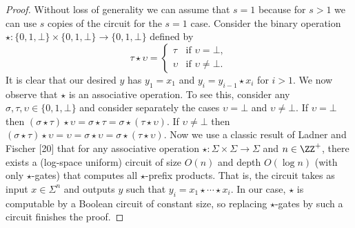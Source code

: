 \begin{proof}
Without loss of generality we can assume that $s=1$ because for $s>1$ we can use $s$ copies of the circuit for the $s=1$ case.
Consider the binary operation $\star:\{0,1,\bot\}\times\{0,1,\bot\}\to\{0,1,\bot\}$ defined by
\[\tau\star\upsilon=\begin{cases}\tau&\text{if }\upsilon=\bot,\\\upsilon&\text{if }\upsilon\ne\bot.\end{cases}\]
It is clear that our desired $y$ has $y_1=x_1$ and $y_i=y_{i-1}\star x_i$ for $i>1$.
We now observe that $\star$ is an associative operation. To see this, consider any $\sigma,\tau,\upsilon\in\{0,1,\bot\}$ and consider separately the cases $\upsilon=\bot$ and $\upsilon\ne\bot$. If $\upsilon=\bot$ then $(\sigma\star\tau)\star\upsilon=\sigma\star\tau=\sigma\star(\tau\star\upsilon)$. If $\upsilon\ne\bot$ then $(\sigma\star\tau)\star\upsilon=\upsilon=\sigma\star\upsilon=\sigma\star(\tau\star\upsilon)$.
Now we use a classic result of Ladner and Fischer [20] that for any associative operation $\star:\Sigma\times\Sigma\to\Sigma$ and $n\in\ZZ^+$, there exists a (log-space uniform) circuit of size $O(n)$ and depth $O(\log n)$ (with only $\star$-gates) that computes all $\star$-prefix products. That is, the circuit takes as input $x\in\Sigma^n$ and outputs $y$ such that $y_i=x_1\star\cdots\star x_i$.
In our case, $\star$ is computable by a Boolean circuit of constant size, so replacing $\star$-gates by such a circuit finishes the proof.
\end{proof}
